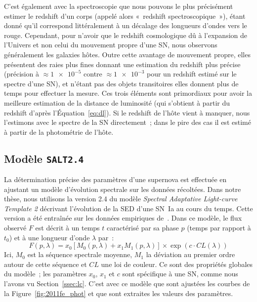 \documentclass[../main/main.tex]{subfiles}
\begin{document}
C'est également avec la spectroscopie que nous pouvons le plus précisément
estimer le redshift d'un corps (appelé alors «~redshift spectroscopique~»),
étant donné qu'il correspond littéralement à un décalage des longueurs d'ondes
vers le rouge. Cependant, pour n'avoir que le redshift cosmologique dû à
l'expansion de l'Univers et non celui du mouvement propre d'une SN, nous
observons généralement les galaxies hôtes. Outre cette avantage de mouvement
propre, elles présentent des raies plus fines donnant une estimation du redshift
plus précise (précision à $\approx \num{1e-5}$ contre $\approx \num{1e-3}$ pour
un redshift estimé sur le spectre d'une SN), et n'étant pas des objets
transitoires elles donnent plus de temps pour effectuer la mesure. Ces trois
éléments sont primordiaux pour avoir la meilleure estimation de la distance de
luminosité (qui s'obtient à partir du redshift d'après l'Équation~\ref{eq:dl}).
Si le redshift de l'hôte vient à manquer, nous l'estimons avec le spectre de la
SN directement~; dans le pire des cas il est estimé à partir de la photométrie
de l'hôte.

\subsection{Modèle \texttt{SALT2.4}}\label{ssec:salt}

La détermination précise des paramètres d'une supernova est effectuée en
ajustant un modèle d'évolution spectrale sur les données récoltées. Dans notre
thèse, nous utilisons la version 2.4 du modèle \textit{Spectral Adaptative
Light-curve Template 2} \citep[\texttt{SALT2},][]{guy2007} décrivant l'évolution
de la SED d'une SN~Ia au cours du temps. Cette version a été entraînée sur les
données empiriques de~\cite{betoule2014}. Dans ce modèle, le flux observé $F$
est décrit à un temps $t$ caractérisé par sa phase $p$ (temps par rapport à
$t_0$) et à une longueur d'onde $\lambda$ par~:
\begin{equation}\label{eq:saltf}
    F(p,\lambda) = x_0\left[ M_0(p,\lambda) + x_1M_1(p,\lambda)
    \right]\times \exp(c\cdot CL(\lambda))
\end{equation}
Ici, $M_0$ est la séquence spectrale moyenne, $M_1$ la déviation au premier
ordre autour de cette séquence et $CL$ une loi de couleur. Ce sont des
propriétés globales du modèle~; les paramètres $x_0$, $x_1$ et $c$ sont
spécifique à une SN, comme nous l'avons vu Section~\ref{ssec:lc}. C'est avec ce
modèle que sont ajustées les courbes de la Figure~\ref{fig:2011fe_phot} et que
sont extraites les valeurs des paramètres.
\end{document}
